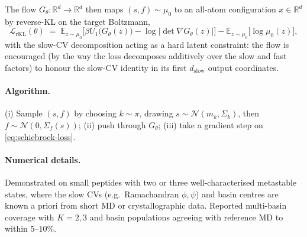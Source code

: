 \documentclass[11pt,letterpaper]{article}
\newcommand{\E}{\mathbb{E}}
\newcommand{\Real}{\mathbb{R}}
\theoremstyle{plain}
\begin{document}
The flow $G_\theta:\Real^d\to\Real^d$ then maps $(s,f)\sim\mu_0$ to an
all-atom configuration $x\in\Real^d$ by reverse-KL on the target
Boltzmann,
\begin{equation}\label{eq:schiebroek-loss}
  \mathcal L_{\mathrm{rKL}}(\theta) \;=\; \E_{z\sim\mu_0}\!\Big[\beta U_1\!\big(G_\theta(z)\big)
       - \log\big|\det\nabla G_\theta(z)\big|\Big] - \E_{z\sim\mu_0}\!\big[\log\mu_0(z)\big],
\end{equation}
with the slow-CV decomposition acting as a hard latent constraint: the
flow is encouraged (by the way the loss decomposes additively over the
slow and fast factors) to honour the slow-CV identity in its first
$d_{\mathrm{slow}}$ output coordinates.

\paragraph{Algorithm.} (i) Sample $(s,f)$ by choosing $k\sim\pi$, drawing
$s\sim\mathcal N(m_k,\Sigma_k)$, then $f\sim\mathcal N(0,\Sigma_f(s))$;
(ii) push through $G_\theta$; (iii) take a gradient step on
\eqref{eq:schiebroek-loss}.

\paragraph{Numerical details.} Demonstrated on small peptides with two or
three well-characterised metastable states, where the slow CVs (e.g.\
Ramachandran $\phi, \psi$) and basin centres are known a priori from
short MD or crystallographic data. Reported multi-basin coverage with
$K=2,3$ and basin populations agreeing with reference MD to within
$5$--$10\%$.
\end{document}
